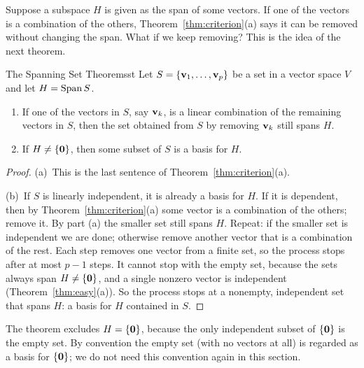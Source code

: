 \documentclass[11pt]{article}
\begin{document}
Suppose a subspace $H$ is given as the span of some vectors. If one of the vectors is a combination of the others, Theorem~\ref{thm:criterion}(a) says it can be removed without changing the span. What if we keep removing? This is the idea of the next theorem.

\begin{thm}{The Spanning Set Theorem}{sst}
Let $S=\{\mathbf{v}_1,\dots,\mathbf{v}_p\}$ be a set in a vector space $V$ and let $H=\operatorname{Span} S$.
\begin{enumerate}[label=(\alph*),itemsep=1pt]
  \item If one of the vectors in $S$, say $\mathbf{v}_k$, is a linear combination of the remaining vectors in $S$, then the set obtained from $S$ by removing $\mathbf{v}_k$ still spans $H$.
  \item If $H\neq\{\mathbf{0}\}$, then some subset of $S$ is a basis for $H$.
\end{enumerate}
\end{thm}

\begin{proof}
(a)~This is the last sentence of Theorem~\ref{thm:criterion}(a).

(b)~If $S$ is linearly independent, it is already a basis for $H$. If it is dependent, then by Theorem~\ref{thm:criterion}(a) some vector is a combination of the others; remove it. By part (a) the smaller set still spans $H$. Repeat: if the smaller set is independent we are done; otherwise remove another vector that is a combination of the rest. Each step removes one vector from a finite set, so the process stops after at most $p-1$ steps. It cannot stop with the empty set, because the sets always span $H\neq\{\mathbf{0}\}$, and a single nonzero vector is independent (Theorem~\ref{thm:easy}(a)). So the process stops at a nonempty, independent set that spans $H$: a basis for $H$ contained in $S$.
\end{proof}

\begin{remark}
The theorem excludes $H=\{\mathbf{0}\}$, because the only independent subset of $\{\mathbf{0}\}$ is the empty set. By convention the empty set (with no vectors at all) is regarded as a basis for $\{\mathbf{0}\}$; we do not need this convention again in this section.
\end{remark}
\end{document}
